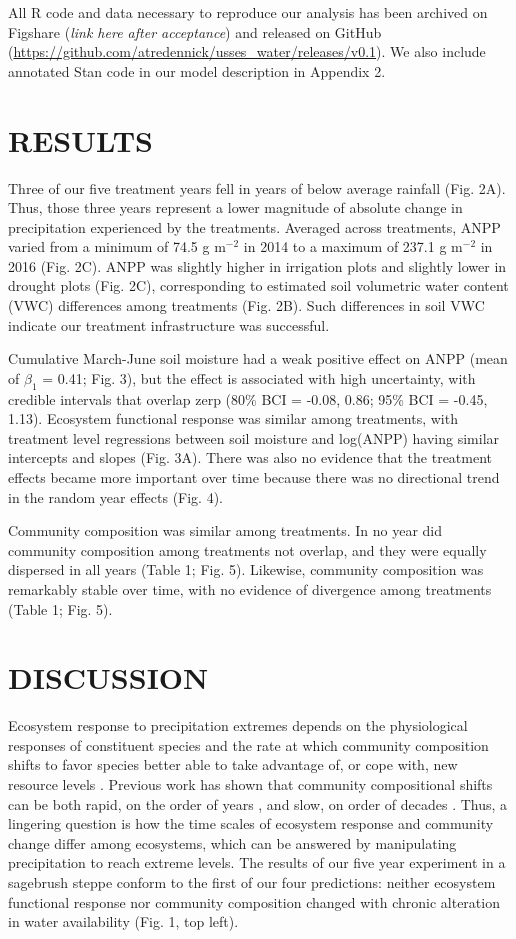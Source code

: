 \documentclass[fleqn,10pt,lineno]{wlpeerj} %
\begin{document}
All R code and data necessary to reproduce our analysis has been
archived on Figshare (\emph{link here after acceptance}) and released on
GitHub (\url{https://github.com/atredennick/usses_water/releases/v0.1}).
We also include annotated Stan code in our model description in Appendix
2.

\section{RESULTS}\label{results}

Three of our five treatment years fell in years of below average
rainfall (Fig. 2A). Thus, those three years represent a lower magnitude
of absolute change in precipitation experienced by the treatments.
Averaged across treatments, ANPP varied from a minimum of 74.5 g
m\(^{-2}\) in 2014 to a maximum of 237.1 g m\(^{-2}\) in 2016 (Fig. 2C).
ANPP was slightly higher in irrigation plots and slightly lower in
drought plots (Fig. 2C), corresponding to estimated soil volumetric
water content (VWC) differences among treatments (Fig. 2B). Such
differences in soil VWC indicate our treatment infrastructure was
successful.

Cumulative March-June soil moisture had a weak positive effect on ANPP
(mean of \(\beta_{1}\) = 0.41; Fig. 3), but the effect is associated
with high uncertainty, with credible intervals that overlap zerp (80\%
BCI = -0.08, 0.86; 95\% BCI = -0.45, 1.13). Ecosystem functional
response was similar among treatments, with treatment level regressions
between soil moisture and log(ANPP) having similar intercepts and slopes
(Fig. 3A). There was also no evidence that the treatment effects became
more important over time because there was no directional trend in the
random year effects (Fig. 4).

Community composition was similar among treatments. In no year did
community composition among treatments not overlap, and they were
equally dispersed in all years (Table 1; Fig. 5). Likewise, community
composition was remarkably stable over time, with no evidence of
divergence among treatments (Table 1; Fig. 5).

\section{DISCUSSION}\label{discussion}

Ecosystem response to precipitation extremes depends on the
physiological responses of constituent species and the rate at which
community composition shifts to favor species better able to take
advantage of, or cope with, new resource levels \citep{Smith2009}.
Previous work has shown that community compositional shifts can be both
rapid, on the order of years \citep{Hoover2014}, and slow, on order of
decades \citep{Knapp2012, Wilcox2016}. Thus, a lingering question is how
the time scales of ecosystem response and community change differ among
ecosystems, which can be answered by manipulating precipitation to reach
extreme levels. The results of our five year experiment in a sagebrush
steppe conform to the first of our four predictions: neither ecosystem
functional response nor community composition changed with chronic
alteration in water availability (Fig. 1, top left).
\end{document}
